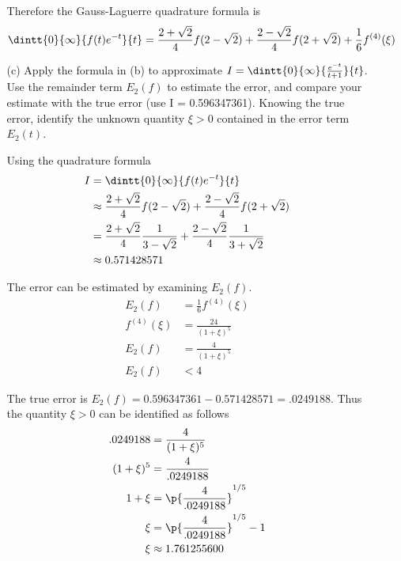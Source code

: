\documentclass[11pt]{article}
\begin{document}
\begin{enumerate}
\begin{enumerate}
                Therefore the Gauss-Laguerre quadrature formula is
                \[
                    \dintt{0}{\infty}{f(t) e^{-t}}{t} =
                        \frac{2 + \sqrt{2}}{4} f(2 - \sqrt{2}) +
                        \frac{2 - \sqrt{2}}{4} f(2 + \sqrt{2}) +
                        \frac{1}{6} f^{(4)}(\xi)
                \]

            \item[(c)] %
                Apply the formula in (b) to approximate
                $I = \dintt{0}{\infty}{\frac{e^{-t}}{t+1}}{t}$.
                Use the remainder term $E_2(f)$ to estimate the error,
                and compare your estimate with the true error (use I = 
                0.596347361).
                Knowing the true error, identify the unknown quantity $\xi > 0$
                contained in the error term $E_2(t)$.

                Using the quadrature formula
                \begin{align*}
                    I &= \dintt{0}{\infty}{f(t) e^{-t}}{t} \\
                    &\approx \frac{2 + \sqrt{2}}{4} f(2 - \sqrt{2}) +
                        \frac{2 - \sqrt{2}}{4} f(2 + \sqrt{2}) \\
                    &= \frac{2 + \sqrt{2}}{4} \frac{1}{3 - \sqrt{2}} +
                        \frac{2 - \sqrt{2}}{4} \frac{1}{3 + \sqrt{2}} \\
                    &\approx 0.571428571
                \end{align*}

                The error can be estimated by examining $E_2(f)$.
                \begin{align*}
                    E_2(f) &= \frac{1}{6} f^{(4)}(\xi) \\
                    f^{(4)}(\xi) &= \frac{24}{(1 + \xi)^5} \\
                    E_2(f) &= \frac{4}{(1 + \xi)^5} \\
                    E_2(f) &< 4
                \end{align*}

                The true error is $E_2(f) = 0.596347361 - 0.571428571 = .0249188$.
                Thus the quantity $\xi > 0$ can be identified as follows
                \begin{align*}
                    .0249188 &= \frac{4}{(1 + \xi)^5} \\
                    (1 + \xi)^5 &= \frac{4}{.0249188} \\
                    1 + \xi &= \p{\frac{4}{.0249188}}^{1/5} \\
                    \xi &= \p{\frac{4}{.0249188}}^{1/5} - 1 \\
                    \xi &\approx 1.761255600
                \end{align*}
        \end{enumerate}


\end{enumerate}
\end{document}
